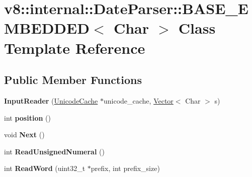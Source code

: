 \hypertarget{classv8_1_1internal_1_1_date_parser_1_1_b_a_s_e___e_m_b_e_d_d_e_d}{}\section{v8\+:\+:internal\+:\+:Date\+Parser\+:\+:B\+A\+S\+E\+\_\+\+E\+M\+B\+E\+D\+D\+ED$<$ Char $>$ Class Template Reference}
\label{classv8_1_1internal_1_1_date_parser_1_1_b_a_s_e___e_m_b_e_d_d_e_d}
\subsection*{Public Member Functions}
\begin{DoxyCompactItemize}
\item 
{\bfseries Input\+Reader} (\hyperlink{classv8_1_1internal_1_1_unicode_cache}{Unicode\+Cache} $\ast$unicode\+\_\+cache, \hyperlink{classv8_1_1internal_1_1_vector}{Vector}$<$ Char $>$ s)\hypertarget{classv8_1_1internal_1_1_date_parser_1_1_b_a_s_e___e_m_b_e_d_d_e_d_a8c67eca94eb4294bd567b3ae5d8f2f97}{}\label{classv8_1_1internal_1_1_date_parser_1_1_b_a_s_e___e_m_b_e_d_d_e_d_a8c67eca94eb4294bd567b3ae5d8f2f97}

\item 
int {\bfseries position} ()\hypertarget{classv8_1_1internal_1_1_date_parser_1_1_b_a_s_e___e_m_b_e_d_d_e_d_af3b261a6c1a66ffa31dc7bf865f8519d}{}\label{classv8_1_1internal_1_1_date_parser_1_1_b_a_s_e___e_m_b_e_d_d_e_d_af3b261a6c1a66ffa31dc7bf865f8519d}

\item 
void {\bfseries Next} ()\hypertarget{classv8_1_1internal_1_1_date_parser_1_1_b_a_s_e___e_m_b_e_d_d_e_d_ab28a66fb52ceeaf722ab738492c6ade2}{}\label{classv8_1_1internal_1_1_date_parser_1_1_b_a_s_e___e_m_b_e_d_d_e_d_ab28a66fb52ceeaf722ab738492c6ade2}

\item 
int {\bfseries Read\+Unsigned\+Numeral} ()\hypertarget{classv8_1_1internal_1_1_date_parser_1_1_b_a_s_e___e_m_b_e_d_d_e_d_ad01fc62f5514172588c9d898db326b9e}{}\label{classv8_1_1internal_1_1_date_parser_1_1_b_a_s_e___e_m_b_e_d_d_e_d_ad01fc62f5514172588c9d898db326b9e}

\item 
int {\bfseries Read\+Word} (uint32\+\_\+t $\ast$prefix, int prefix\+\_\+size)\hypertarget{classv8_1_1internal_1_1_date_parser_1_1_b_a_s_e___e_m_b_e_d_d_e_d_a2afacb2558cdf3c26c64b6c7aa1a01e8}{}\label{classv8_1_1internal_1_1_date_parser_1_1_b_a_s_e___e_m_b_e_d_d_e_d_a2afacb2558cdf3c26c64b6c7aa1a01e8}


\end{DoxyCompactItemize}
